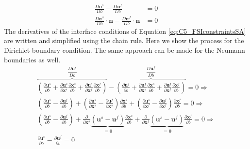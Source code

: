 %
%
\begin{subequations}\label{eq:C5_FSIconstraintsSA}
\begin{align}
	\frac{D \mathbf{u}^s}{D b} - 
	\frac{D \mathbf{u}^f}{D b} &= 0
	\\
	\frac{D \mathbf{\sigma}^s}{D b} \cdot \mathbf{n} - 
	\frac{D \mathbf{\sigma}^f}{D b} \cdot \mathbf{n} &= 0
\end{align}
\end{subequations}
%
The derivatives of the interface conditions of Equation \eqref{eq:C5_FSIconstraintsSA} are written and simplified using the chain rule. Here we show the process for the Dirichlet boundary condition. The same approach can be made for the Neumann boundaries as well.
%
\begin{gather*}
	\overbrace{	
	\left(
	\frac{\partial \mathbf{u}^s}{\partial b} +
	\frac{\partial \mathbf{u}^s}{\partial \mathbf{x}^s} \frac{\partial \mathbf{x}^s}{\partial b} +
	\frac{\partial \mathbf{u}^s}{\partial \mathbf{x}^f} \frac{\partial \mathbf{x}^f}{\partial b}
	\right)
	}^{\dfrac{D \mathbf{u}^s}{D b}} -
	\overbrace{
	\left(
	\frac{\partial \mathbf{u}^f}{\partial b} +
	\frac{\partial \mathbf{u}^f}{\partial \mathbf{x}^s} \frac{\partial \mathbf{x}^s}{\partial b} +
	\frac{\partial \mathbf{u}^f}{\partial \mathbf{x}^f} \frac{\partial \mathbf{x}^f}{\partial b}
	\right)
	}^{\dfrac{D \mathbf{u}^f}{D b}} = 0 \Longrightarrow
	\\
	\left(
	\frac{\partial \mathbf{u}^s}{\partial b} - \frac{\partial \mathbf{u}^f}{\partial b}
	\right) +
	\left(
	\frac{\partial \mathbf{u}^s}{\partial \mathbf{x}^s} - 
	\frac{\partial \mathbf{u}^f}{\partial \mathbf{x}^s}
	\right) \frac{\partial \mathbf{x}^s}{\partial b} +
	\left(
	\frac{\partial \mathbf{u}^s}{\partial \mathbf{x}^f} - 
	\frac{\partial \mathbf{u}^f}{\partial \mathbf{x}^f}
	\right) \frac{\partial \mathbf{x}^f}{\partial b} = 
	0 \Longrightarrow
	\\
	\left(
	\frac{\partial \mathbf{u}^s}{\partial b} - \frac{\partial \mathbf{u}^f}{\partial b}
	\right) +
	\frac{\partial }{\partial \mathbf{x}^s}
	\underbrace{	
	\left(
	\mathbf{u}^s - \mathbf{u}^f
	\right)
	}_{=\mathbf{0}} \frac{\partial \mathbf{x}^s}{\partial b} +
	\frac{\partial }{\partial \mathbf{x}^f}
	\underbrace{	
	\left(
	\mathbf{u}^s - \mathbf{u}^f
	\right)
	}_{=\mathbf{0}} \frac{\partial \mathbf{x}^f}{\partial b} = 
	0 \Longrightarrow
	\\
	\frac{\partial \mathbf{u}^s}{\partial b} - 
	\frac{\partial \mathbf{u}^f}{\partial b} = 0
\end{gather*}
